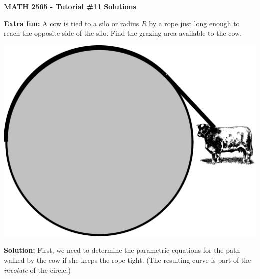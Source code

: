 \documentclass[12pt]{article}
\begin{document}
\author{Instructor: Sean Fitzpatrick}
\thispagestyle{empty}
\begin{center}
{\bf MATH 2565 - Tutorial \#11 Solutions}
\end{center}
\begin{multicols}{2}
\textbf{Extra fun:} A cow is tied to a silo or radius $R$ by a rope just long enough to reach the opposite side of the silo. Find the grazing area available to the cow.

\begin{center}
\includegraphics[width=0.9\columnwidth]{cowpic}
\end{center}
\end{multicols}

\textbf{Solution:} First, we need to determine the parametric equations for the path walked by the cow if she keeps the rope tight. (The resulting curve is part of the \textit{involute} of the circle.)
\end{document}
